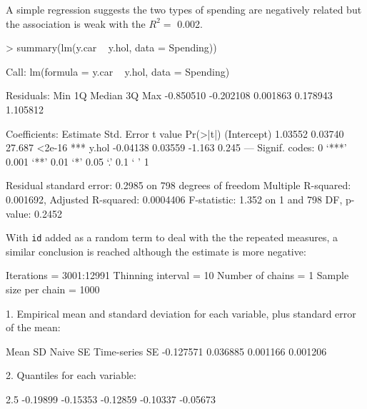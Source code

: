 \documentclass{article}
\begin{document}
A simple regression suggests the two types of spending are negatively related but the association is weak with the $R^{2}=$ 0.002.

\begin{Schunk}
\begin{Sinput}
> summary(lm(y.car ~ y.hol, data = Spending))
\end{Sinput}
\begin{Soutput}
Call:
lm(formula = y.car ~ y.hol, data = Spending)

Residuals:
      Min        1Q    Median        3Q       Max 
-0.850510 -0.202108  0.001863  0.178943  1.105812 

Coefficients:
            Estimate Std. Error t value Pr(>|t|)    
(Intercept)  1.03552    0.03740  27.687   <2e-16 ***
y.hol       -0.04138    0.03559  -1.163    0.245    
---
Signif. codes:  0 `***' 0.001 `**' 0.01 `*' 0.05 `.' 0.1 ` ' 1 

Residual standard error: 0.2985 on 798 degrees of freedom
Multiple R-squared: 0.001692,	Adjusted R-squared: 0.0004406 
F-statistic: 1.352 on 1 and 798 DF,  p-value: 0.2452 
\end{Soutput}
\end{Schunk}

With \texttt{id} added as a random term to deal with the the repeated measures, a similar conclusion is reached although the estimate is more negative:

\iftalk
\else
\fi

\begin{Schunk}
\begin{Soutput}
Iterations = 3001:12991
Thinning interval = 10 
Number of chains = 1 
Sample size per chain = 1000 

1. Empirical mean and standard deviation for each variable,
   plus standard error of the mean:

          Mean             SD       Naive SE Time-series SE 
     -0.127571       0.036885       0.001166       0.001206 

2. Quantiles for each variable:

    2.5%
-0.19899 -0.15353 -0.12859 -0.10337 -0.05673 
\end{Soutput}
\end{Schunk}
\end{document}
